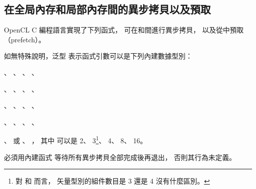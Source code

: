 \subsection[sec:asyncCopyPrefetch]{在全局內存和局部內存間的異步拷貝以及預取}

OpenCL C 編程語言實現了下列函式，
可在和間進行異步拷貝，
以及從中預取（prefetch）。

如無特殊說明，泛型  表示函式引數可以是下列內建數據型別：
\startigBase[indentnext=no]
\item {}、 、 、 、
\item {}、 、 、 、
\item {}、 、 、 、
\item {}、 、 、 、
\item {}、  或 、 ，
\stopigBase
其中  可以是 2、 3\footnote{
對  和  而言，
矢量型別的組件數目是 3 還是 4 沒有什麼區別。}、 4、 8、 16。

{}

\startnotepar
{}必須用內建函式  等待所有異步拷貝全部完成後再退出，
否則其行為未定義。
\stopnotepar

